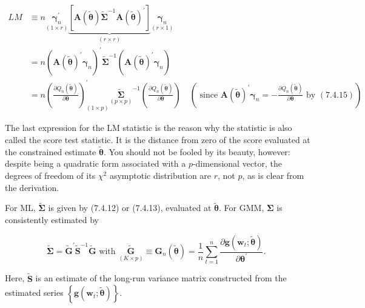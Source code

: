 \documentclass[10pt]{article}
\begin{document}
\begin{align*}
L M & \equiv n \underset{(1 \times r)}{\boldsymbol{\gamma}_{n}^{\prime}} \underbrace{\left[\mathbf{A}(\tilde{\boldsymbol{\theta}}) \widetilde{\mathbf{\Sigma}}^{-1} \mathbf{A}(\tilde{\boldsymbol{\theta}})^{\prime}\right]}_{(r \times r)} \underset{(r \times 1)}{\boldsymbol{\gamma}_{n}} \\
& =n\left(\mathbf{A}(\tilde{\boldsymbol{\theta}})^{\prime} \boldsymbol{\gamma}_{n}\right)^{\prime} \widetilde{\mathbf{\Sigma}}^{-1}\left(\mathbf{A}(\tilde{\boldsymbol{\theta}})^{\prime} \boldsymbol{\gamma}_{n}\right) \\
& =n\left(\frac{\partial Q_{n}(\tilde{\boldsymbol{\theta}})}{\partial \boldsymbol{\theta}}\right)_{(1 \times p)}^{\prime}{\underset{(p \times p)}{\widetilde{\mathbf{\Sigma}}}}^{-1}\left(\frac{\partial Q_{n}(\tilde{\boldsymbol{\theta}})}{\partial \boldsymbol{\theta}}\right) \quad\left(\text { since } \mathbf{A}(\tilde{\boldsymbol{\theta}})^{\prime} \boldsymbol{\gamma}_{n}=-\frac{\partial Q_{n}(\tilde{\boldsymbol{\theta}})}{\partial \boldsymbol{\theta}} \text { by }(7.4 .15)\right) \tag{7.4.25}
\end{align*}


The last expression for the LM statistic is the reason why the statistic is also called the score test statistic. It is the distance from zero of the score evaluated at the constrained estimate $\tilde{\boldsymbol{\theta}}$. You should not be fooled by its beauty, however: despite being a quadratic form associated with a $p$-dimensional vector, the degrees of freedom of its $\chi^{2}$ asymptotic distribution are $r$, not $p$, as is clear from the derivation.

For ML, $\widetilde{\boldsymbol{\Sigma}}$ is given by (7.4.12) or (7.4.13), evaluated at $\tilde{\boldsymbol{\theta}}$. For GMM, $\boldsymbol{\Sigma}$ is consistently estimated by


\begin{equation*}
\widetilde{\boldsymbol{\Sigma}}=\widetilde{\mathbf{G}}^{\prime} \widetilde{\mathbf{S}}^{-1} \widetilde{\mathbf{G}} \text { with } \underset{(K \times p)}{\widetilde{\mathbf{G}}} \equiv \mathbf{G}_{n}(\tilde{\boldsymbol{\theta}})=\frac{1}{n} \sum_{t=1}^{n} \frac{\partial \mathbf{g}\left(\mathbf{w}_{t} ; \tilde{\boldsymbol{\theta}}\right)}{\partial \boldsymbol{\theta}^{\prime}} \text {. } \tag{7.4.26}
\end{equation*}


Here, $\widetilde{\mathbf{S}}$ is an estimate of the long-run variance matrix constructed from the estimated series $\left\{\mathbf{g}\left(\mathbf{w}_{t} ; \tilde{\boldsymbol{\theta}}\right)\right\}$.
\end{document}
